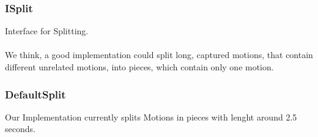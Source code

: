 \documentclass[a4paper,10pt,titlepage,bibliography=totocnumbered]{scrartcl}
\begin{document}
\subsubsection{ISplit}

Interface for Splitting.
\\\\
We think, a good implementation could split long, captured motions, that contain different unrelated motions, into pieces, which contain only one motion.

\subsubsection{DefaultSplit}

Our Implementation currently splits Motions in pieces with lenght around 2.5 seconds.


 
\end{document}
